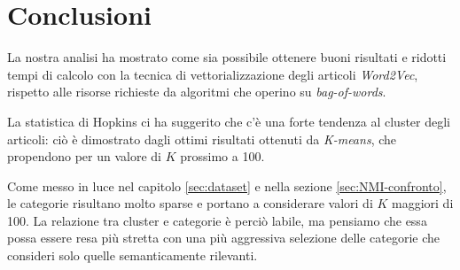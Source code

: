 \documentclass[
	11pt, %
	a4paper, %
	oneside, %
	headinclude,footinclude, %
	BCOR5mm, %
]{scrartcl}
\begin{document}
\section{Conclusioni} \label{sec:conclusion}
	La nostra analisi ha mostrato come sia possibile ottenere buoni risultati e ridotti tempi di calcolo con la tecnica di vettorializzazione degli articoli \emph{Word2Vec}, rispetto alle risorse richieste da algoritmi che operino su \emph{bag-of-words}.
	
	La statistica di Hopkins ci ha suggerito che c'è una forte tendenza al cluster degli articoli: ciò è dimostrato dagli ottimi risultati ottenuti da \emph{K-means}, che propendono per un valore di $K$ prossimo a 100.
	
	Come messo in luce nel capitolo \ref{sec:dataset} e nella sezione \ref{sec:NMI-confronto}, le categorie risultano molto sparse e portano a considerare valori di $K$ maggiori di 100. La relazione tra cluster e categorie è perciò labile, ma pensiamo che essa possa essere resa più stretta con una più aggressiva selezione delle categorie che consideri solo quelle semanticamente rilevanti.	
		
	
\end{document}
